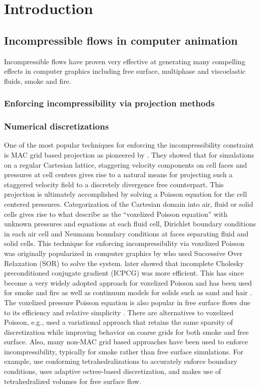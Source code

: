 \chapter{Introduction}
\section{Incompressible flows in computer animation}
Incompressible flows have proven very effective at generating many compelling effects in computer graphics including free surface, multiphase and viscoelastic fluids, smoke and fire.
	\subsection{Enforcing incompressibility via projection methods}
	
	\subsection{Numerical discretizations}
	One of the most popular techniques for enforcing the incompressibility constraint is MAC grid based projection as pioneered by \cite{HW65}. They showed that for simulations on a regular
Cartesian lattice, staggering velocity components on cell faces and pressures at cell centers gives rise to a natural means for projecting such a staggered velocity field to a discretely
divergence free counterpart. This projection is ultimately accomplished by solving a Poisson equation for the cell centered pressures. Categorization of the Cartesian domain into air,
fluid or solid cells gives rise to what \cite{BBB07} describe as the ``voxelized Poisson equation'' with unknown pressures and equations at each fluid cell, Dirichlet boundary conditions
in each air cell and Neumann boundary conditions at faces separating fluid and solid cells. This technique for enforcing incompressibility via voxelized Poisson was originally
popularized in computer graphics by \cite{FM96} who used Successive Over Relaxation (SOR) to solve the system. \cite{FF01} later showed that incomplete Cholesky preconditioned conjugate
gradient (ICPCG) was more efficient. This has since become a very widely adopted approach for voxelized Poisson and has been used for smoke \cite{SRF05,MTPS04,FSJ01} and fire \cite{HG09} as well as continuum models for solids such as sand \cite{zhu:2005:sand} and hair \cite{MSWST09}. The voxelized pressure Poisson equation is also popular in free surface flows due to its efficiency and relative simplicity
\cite{CMT04,FF01,GBO04,HK05,HLYK08,KC07,MTPS04,NNSM08,WMT05,zhu:2005:sand}. There are alternatives to voxelized Poisson, e.g., \cite{BBB07} used a variational approach that retains the same sparsity of discretization while improving behavior on coarse grids for both smoke and free surface. Also, many non-MAC grid based approaches have been used to enforce incompressibility, typically for smoke rather than free surface simulations. For example, \cite{MCPTD09,KFCO06,FOK05,ETKSD07} use conforming tetrahedralizations to accurately enforce boundary conditions, \cite{LGF04} uses adaptive octree-based discretization, and \cite{CNF07} makes use of tetrahedralized volumes for free surface flow.

